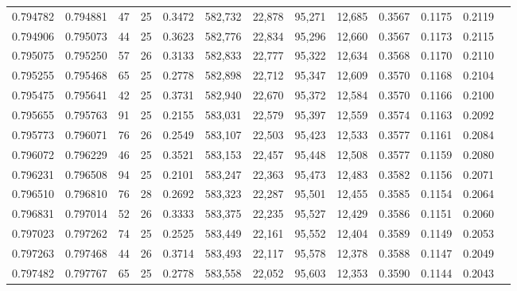 \begin{tabular}{rrrrrrrrrrrrr}
0.794782 & 0.794881 &    47 &  25 &                                     0.3472 & 582,732 &  22,878 &  95,271 &  12,685 & 0.3567 & 0.1175 & 0.2119 \\
0.794906 & 0.795073 &    44 &  25 &                                     0.3623 & 582,776 &  22,834 &  95,296 &  12,660 & 0.3567 & 0.1173 & 0.2115 \\
0.795075 & 0.795250 &    57 &  26 &                                     0.3133 & 582,833 &  22,777 &  95,322 &  12,634 & 0.3568 & 0.1170 & 0.2110 \\
0.795255 & 0.795468 &    65 &  25 &                                     0.2778 & 582,898 &  22,712 &  95,347 &  12,609 & 0.3570 & 0.1168 & 0.2104 \\
0.795475 & 0.795641 &    42 &  25 &                                     0.3731 & 582,940 &  22,670 &  95,372 &  12,584 & 0.3570 & 0.1166 & 0.2100 \\
0.795655 & 0.795763 &    91 &  25 &                                     0.2155 & 583,031 &  22,579 &  95,397 &  12,559 & 0.3574 & 0.1163 & 0.2092 \\
0.795773 & 0.796071 &    76 &  26 &                                     0.2549 & 583,107 &  22,503 &  95,423 &  12,533 & 0.3577 & 0.1161 & 0.2084 \\
0.796072 & 0.796229 &    46 &  25 &                                     0.3521 & 583,153 &  22,457 &  95,448 &  12,508 & 0.3577 & 0.1159 & 0.2080 \\
0.796231 & 0.796508 &    94 &  25 &                                     0.2101 & 583,247 &  22,363 &  95,473 &  12,483 & 0.3582 & 0.1156 & 0.2071 \\
0.796510 & 0.796810 &    76 &  28 &                                     0.2692 & 583,323 &  22,287 &  95,501 &  12,455 & 0.3585 & 0.1154 & 0.2064 \\
0.796831 & 0.797014 &    52 &  26 &                                     0.3333 & 583,375 &  22,235 &  95,527 &  12,429 & 0.3586 & 0.1151 & 0.2060 \\
0.797023 & 0.797262 &    74 &  25 &                                     0.2525 & 583,449 &  22,161 &  95,552 &  12,404 & 0.3589 & 0.1149 & 0.2053 \\
0.797263 & 0.797468 &    44 &  26 &                                     0.3714 & 583,493 &  22,117 &  95,578 &  12,378 & 0.3588 & 0.1147 & 0.2049 \\
0.797482 & 0.797767 &    65 &  25 &                                     0.2778 & 583,558 &  22,052 &  95,603 &  12,353 & 0.3590 & 0.1144 & 0.2043 \\

\end{tabular}
